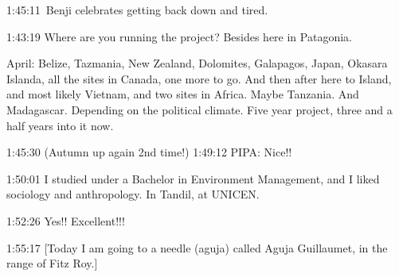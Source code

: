 1:45:11~Benji celebrates getting back down and tired.

1:43:19 Where are you running the project? Besides here in Patagonia.

April: Belize, Tazmania, New Zealand, Dolomites, Galapagos, Japan,
Okasara Islanda, all the sites in Canada, one more to go. And then after
here to Island, and most likely Vietnam, and two sites in Africa. Maybe
Tanzania. And Madagascar. Depending on the political climate. Five year
project, three and a half years into it now.

1:45:30 (Autumn up again 2nd time!) 1:49:12 PIPA: Nice!!

1:50:01 I studied under a Bachelor in Environment Management, and I
liked sociology and anthropology. In Tandil, at UNICEN.

1:52:26 Yes!! Excellent!!!

1:55:17 {[}Today I am going to a needle (aguja) called Aguja Guillaumet,
in the range of Fitz Roy.{]}
